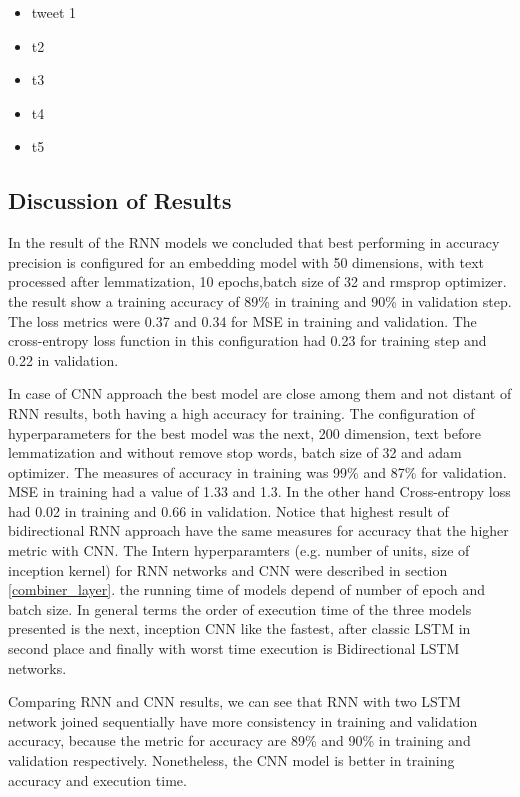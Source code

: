 \documentclass[12pt]{report}
\begin{document}
 \begin{itemize}[nolistsep]
 	\item tweet 1
 	\item t2
 	\item t3
 	\item t4
 	\item t5
 \end{itemize}

\subsection{Discussion of Results}

In the result of the \ac{RNN} models we concluded that best performing in accuracy precision is configured for an embedding model with 50 dimensions, with text processed after lemmatization, 10 epochs,batch size of 32 and rmsprop optimizer. the result show a training accuracy of 89\% in training and 90\% in validation step. The loss metrics were 0.37 and 0.34 for {MSE} in training and validation. The cross-entropy loss function in this configuration had 0.23 for training step and 0.22 in validation.

In case of {CNN} approach the best model are close among them and not distant of \ac{RNN} results, both having a high accuracy for training. The configuration of hyperparameters for the best model was the next, 200 dimension, text before lemmatization and without remove stop words, batch size of 32 and adam optimizer. The measures of accuracy in training was 99\% and 87\% for validation. {MSE} in training had a value of 1.33 and 1.3. In the other hand Cross-entropy loss had 0.02 in training and 0.66 in validation. Notice that highest result of bidirectional \ac{RNN} approach have the same measures for accuracy that the higher metric with \ac{CNN}. The Intern hyperparamters (e.g. number of units, size of inception kernel) for {RNN} networks and CNN were described in section \ref{combiner_layer}.
the running time of models depend of number of epoch and batch size. In general terms the order of execution time of the three models presented is the next, inception {CNN} like the fastest, after classic {LSTM} in second place and finally with worst time execution is Bidirectional {LSTM} networks.

Comparing {RNN} and {CNN} results, we can see that {RNN} with two {LSTM} network joined sequentially have more consistency in training and validation accuracy, because the metric for accuracy are 89\% and 90\% in training and validation respectively. Nonetheless, the {CNN} model is better in training accuracy and execution time.
\end{document}
